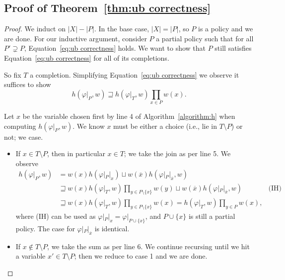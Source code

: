 \subsection{Proof of Theorem~\ref{thm:ub correctness}}
\label{appendix:proof ub correctness}

\begin{proof}
  We induct on $|X| - |P|$. In the base case, $|X| = |P|$, so $P$ is
  a policy and we are done. For our inductive argument, consider
  $P$ a partial policy such that for all $P' \supsetneq P$,
  Equation~\ref{eq:ub correctness} holds.
  We want to show that $P$ still satisfies Equation~\ref{eq:ub correctness}
  for all of its completions.

  So fix $T$ a completion. Simplifying Equation~\ref{eq:ub correctness}
  we observe it suffices to show
  \begin{equation}
    h(\varphi|_P, w) \sqsupseteq h(\varphi|_T,w)\prod_{x \in P} w(x).
  \end{equation}

  Let $x$ be the variable chosen first by line 4 of Algorithm~\ref{algorithm:h}
  when computing $h(\varphi|_P, w)$.
  We know $x$ must be either a choice (i.e., lie in $T \setminus P$) or not; we case.
  \begin{itemize}
    \item If $x \in T \setminus P$, 
    then in particular $x \in T$; 
    we take the join as per line 5. We observe
    \begin{align*}
      h(\varphi|_P, w)
        &= w(x)h(\varphi|_{P}|_x) 
          \sqcup w(\overline x)h(\varphi|_{P}|_{\overline x},w) \\ 
        &\sqsupseteq w(x)h(\varphi|_T,w)\prod_{y \in P\setminus \{x\}}w(y) 
          \sqcup w(\overline x)h(\varphi|_{P}|_{\overline x},w)&\text{(IH)}\\  
        &\sqsupseteq w(x)h(\varphi|_T,w)\prod_{y \in P\setminus \{x\}}w(x) 
        = \boxed{h(\varphi|_T,w)\prod_{y \in P}w(x),}    
    \end{align*}
    where (IH) can be used as $\varphi|_{P}|_x = \varphi|_{P \cup \{x\}}$,
    and $P \cup \{x\}$ is still a partial policy. The case for 
    $\varphi|_P|_{\overline x}$ is identical.
    \item If $x \notin T\setminus P$, 
    we take the sum as per line 6. 
    We continue recursing until we hit a variable $x' \in T \setminus P$; 
    then we reduce to case 1 and we are done.
  \end{itemize}
\end{proof}

